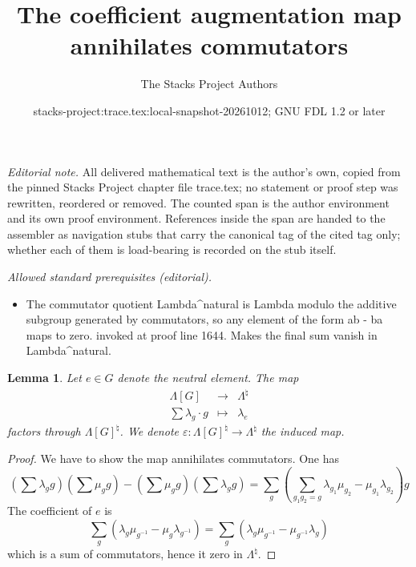 \documentclass{stacks-project}
\title{The coefficient augmentation map annihilates commutators}
\author{The Stacks Project Authors}
\date{stacks-project:trace.tex:local-snapshot-20261012; GNU FDL 1.2 or later}
\theoremstyle{plain}
\newtheorem{lemma}[subsection]{Lemma}
\theoremstyle{definition}
\theoremstyle{remark}
\numberwithin{equation}{subsection}
\begin{document}
\maketitle
\setcounter{subsection}{1}
\noindent\textit{Editorial note.} All delivered mathematical text is the author's own, copied from the pinned Stacks Project chapter file trace.tex; no statement or proof step was rewritten, reordered or removed. The counted span is the author environment and its own proof environment. References inside the span are handed to the assembler as navigation stubs that carry the canonical tag of the cited tag only; whether each of them is load-bearing is recorded on the stub itself.\par\medskip
\noindent\textit{Allowed standard prerequisites (editorial).}\begin{itemize}
\item The commutator quotient Lambda\textasciicircum{}natural is Lambda modulo the additive subgroup generated by commutators, so any element of the form ab - ba maps to zero. invoked at proof line 1644. Makes the final sum vanish in Lambda\textasciicircum{}natural.
\end{itemize}\medskip
\begin{lemma}
\label{lemma-epsilon}
Let $e\in G$ denote the neutral element. The map
$$
\begin{matrix}
\Lambda[G] & \longrightarrow & \Lambda^{\natural}\\
\sum \lambda_g\cdot g & \longmapsto & \lambda_e
\end{matrix}
$$
factors through $\Lambda[G]^\natural$. We denote
$\varepsilon : \Lambda[G]^\natural\to \Lambda^\natural$ the induced map.
\end{lemma}

\begin{proof}
We have to show the map annihilates commutators. One has
$$
\left(\sum\lambda_g g\right)\left(\sum\mu_g g\right)-\left(\sum \mu_g
g\right)\left(\sum\lambda_g g\right)
= \sum_g\left(\sum_{g_1g_2=g}
\lambda_{g_1}\mu_{g_2}-\mu_{g_1}\lambda_{g_2}\right)g
$$
The coefficient of $e$ is
$$
\sum_g\left(\lambda_g\mu_{g^{-1}}-\mu_g\lambda_{g^{-1}}\right) =
\sum_g\left(\lambda_g\mu_{g^{-1}}-\mu_{g^{-1}}\lambda_g\right)
$$
which is a sum of commutators, hence it zero in $\Lambda^\natural$.
\end{proof}
\end{document}
